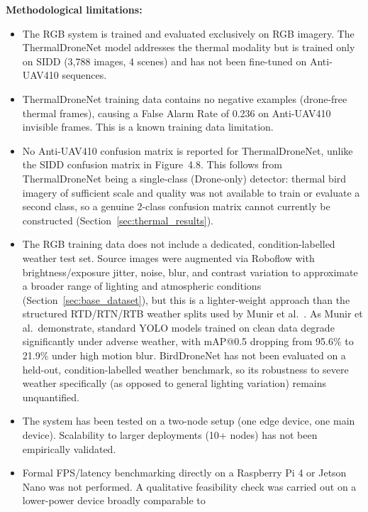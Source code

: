 \documentclass[12pt,a4paper]{report}
\begin{document}
\textbf{Methodological limitations:}
\begin{itemize}
  \item The RGB system is trained and evaluated exclusively on RGB imagery.
        The ThermalDroneNet model addresses the thermal modality but is trained
        only on SIDD (3,788 images, 4 scenes) and has not been fine-tuned
        on Anti-UAV410 sequences.
  \item ThermalDroneNet training data contains no negative examples (drone-free
        thermal frames), causing a False Alarm Rate of 0.236 on Anti-UAV410
        invisible frames. This is a known training data limitation.
  \item No Anti-UAV410 confusion matrix is reported for ThermalDroneNet, unlike
        the SIDD confusion matrix in Figure~4.8. This follows from
        ThermalDroneNet being a single-class (Drone-only) detector: thermal
        bird imagery of sufficient scale and quality was not available to
        train or evaluate a second class, so a genuine 2-class confusion
        matrix cannot currently be constructed (Section~\ref{sec:thermal_results}).
  \item The RGB training data does not include a dedicated, condition-labelled
        weather test set. Source images were augmented via Roboflow with
        brightness/exposure jitter, noise, blur, and contrast variation to
        approximate a broader range of lighting and atmospheric conditions
        (Section~\ref{sec:base_dataset}), but this is a lighter-weight
        approach than the structured RTD/RTN/RTB weather splits used by
        Munir et al.~\cite{munir2023kfupm}. As Munir et al.\ demonstrate,
        standard YOLO models trained on clean data degrade significantly
        under adverse weather, with mAP@0.5 dropping from 95.6\% to 21.9\%
        under high motion blur. BirdDroneNet has not been evaluated on a
        held-out, condition-labelled weather benchmark, so its robustness
        to severe weather specifically (as opposed to general lighting
        variation) remains unquantified.
  \item The system has been tested on a two-node setup (one edge device,
        one main device). Scalability to larger deployments (10+ nodes)
        has not been empirically validated.
  \item Formal FPS/latency benchmarking directly on a Raspberry Pi 4 or
        Jetson Nano was not performed. A qualitative feasibility check was
        carried out on a lower-power device broadly comparable to

\end{itemize}
\end{document}
